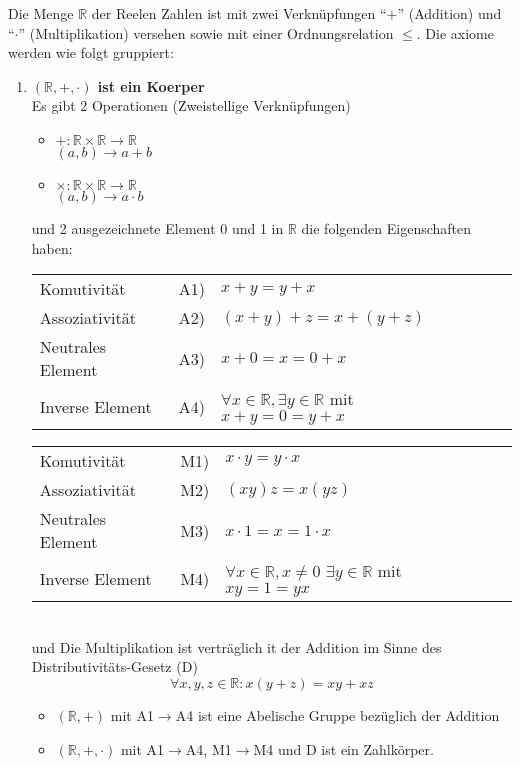 Die Menge $\mathbb{R}$ der Reelen Zahlen ist mit zwei Verknüpfungen ``$+$'' (Addition) und ``$\cdot$'' (Multiplikation) versehen sowie mit einer Ordnungsrelation $\leq$. Die axiome werden wie folgt gruppiert:
\begin{enumerate}
\item \textbf{$\left( \mathbb{R},+,\cdot\right)$ ist ein Koerper}\\
Es gibt 2 Operationen (Zweistellige Verknüpfungen)
\begin{itemize}
\item $+:\mathbb{R}\times\mathbb{R}\rightarrow\mathbb{R}$\\
$(a,b)\rightarrow a+b$
\item $\times:\mathbb{R}\times\mathbb{R}\rightarrow\mathbb{R}$\\
$(a,b)\rightarrow a\cdot b$
\end{itemize}
und 2 ausgezeichnete Element 0 und 1 in $\mathbb{R}$ die folgenden Eigenschaften haben:\\

\begin{tabular}{l r l r l}
Komutivität & A1) & $x+y=y+x$  \\ 
Assoziativität & A2) & $(x+y)+z=x+(y+z)$  \\
Neutrales Element & A3) & $x+0=x=0+x$ \\
Inverse Element & A4) & $\forall x\in\mathbb{R}, \exists y\in\mathbb{R}$ mit $x+y=0=y+x$
\end{tabular}

\begin{tabular}{l r l r l}
Komutivität  & M1) & $x\cdot y=y\cdot x$ \\ 
Assoziativität  & M2) & $(xy)z=x(yz)$ \\
Neutrales Element  & M3) & $x\cdot 1= x =1\cdot x$\\
Inverse Element  & M4) & $\forall x\in\mathbb{R}, x\not =0$  $ \exists y\in\mathbb{R}$ mit $xy=1=yx$
\end{tabular}
\\

und Die Multiplikation ist verträglich it der Addition im Sinne des Distributivitäts-Gesetz (D)\[\forall x,y,z\in\mathbb{R}:x(y+z)=xy+xz\]

\begin{itemize}
\item $( \mathbb{R},+)$ mit A1$\rightarrow$A4 ist eine Abelische Gruppe bezüglich der Addition
\item  $( \mathbb{R},+,\cdot)$ mit A1$\rightarrow$A4, M1$\rightarrow$M4 und D ist ein Zahlkörper. 
\end{itemize}


\end{enumerate}

